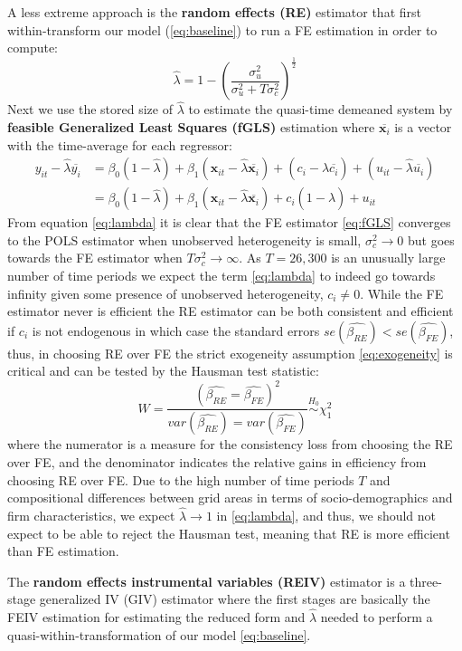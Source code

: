 \bigskip\par
A less extreme approach is the \textbf{random effects (RE)} estimator that first within-transform our model (\ref{eq:baseline}) to run a FE estimation in order to compute:
\begin{equation}
  \widehat{\lambda}=1-\left(\frac{\sigma^2_u}{\sigma^2_u+T\sigma^2_c}\right)^\frac{1}{2}
  \label{eq:lambda}
\end{equation}
Next we use the stored size of $\widehat{\lambda}$ to estimate the quasi-time demeaned system by \textbf{feasible Generalized Least Squares (fGLS)} estimation where $\overline{\bm{x}_i}$ is a vector with the time-average for each regressor:
\begin{equation}
    \begin{split}
        y_{it}-\widehat{\lambda}\overline{y_i}&=\beta_0\left(1-\widehat{\lambda}\right)+\beta_1\left(\bm{x}_{it}-\widehat{\lambda}\overline{\bm{x}_i}\right)+\left(c_i-\widehat{\lambda}\overline{c_i}\right)+\left(u_{it}-\widehat{\lambda}\overline{u_i}\right) \\
        &=\beta_0\left(1-\widehat{\lambda}\right)+\beta_1\left(\bm{x}_{it}-\widehat{\lambda}\overline{\bm{x}_i}\right)+c_i\left(1-\widehat{\lambda}\right)+u_{it}
    \end{split}
    \label{eq:fGLS}
\end{equation}
From equation \eqref{eq:lambda} it is clear that the FE estimator \eqref{eq:fGLS} converges to the POLS estimator when unobserved heterogeneity is small, $\sigma_c^2\rightarrow0$ but goes towards the FE estimator when $T\sigma_c^2\rightarrow\infty$. As $T=26,300$ is an unusually large number of time periods we expect the term \eqref{eq:lambda} to indeed go towards infinity given some presence of unobserved heterogeneity, $c_i\neq0$. While the FE estimator never is efficient the RE estimator can be both consistent and efficient if $c_i$ is not endogenous in which case the standard errors $se\left(\widehat{\beta_{RE}}\right)<se\left(\widehat{\beta_{FE}}\right)$, thus, in choosing RE over FE the strict exogeneity assumption \eqref{eq:exogeneity} is critical and can be tested by the Hausman test statistic:
\begin{equation}
  W=\frac{\left(\widehat{\beta_{RE}}=\widehat{\beta_{FE}}\right)^2}
         {var(\widehat{\beta_{RE}})=var(\widehat{\beta_{FE}})}
         \stackrel{H_0}{\sim} \chi^2_1
  \label{eq:hausman}
\end{equation}
where the numerator is a measure for the consistency loss from choosing the RE over FE, and the denominator indicates the relative gains in efficiency from choosing RE over FE. Due to the high number of time periods $T$ and compositional differences between grid areas in terms of socio-demographics and firm characteristics, we expect $\widehat{\lambda}\rightarrow 1$ in \eqref{eq:lambda}, and thus, we should not expect to be able to reject the Hausman test, meaning that RE is more efficient than FE estimation.
\par
The \textbf{random effects instrumental variables (REIV)} estimator is a three-stage generalized IV (GIV) estimator where the first stages are basically the FEIV estimation for estimating the reduced form and $\widehat{\lambda}$ needed to perform a quasi-within-transformation of our model \eqref{eq:baseline}.
